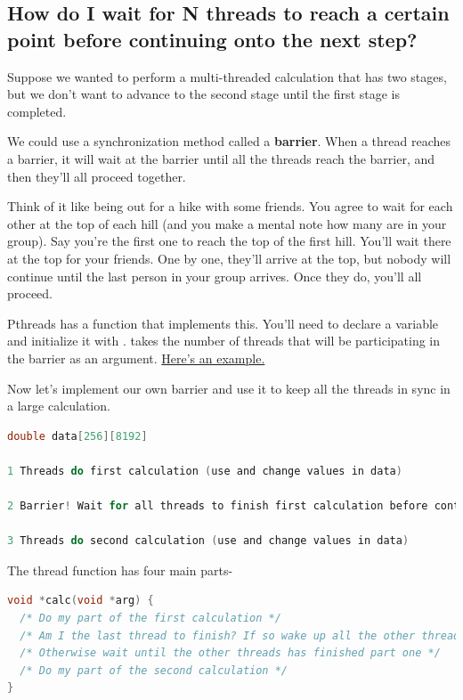 \subsection{How do I wait for N threads to reach a certain point before continuing onto the next step?}\label{how-do-i-wait-for-n-threads-to-reach-a-certain-point-before-continuing-onto-the-next-step}

Suppose we wanted to perform a multi-threaded calculation that has two stages, but we don't want to advance to the second stage until the first stage is completed.

We could use a synchronization method called a \textbf{barrier}. When a thread reaches a barrier, it will wait at the barrier until all the threads reach the barrier, and then they'll all proceed together.

Think of it like being out for a hike with some friends. You agree to wait for each other at the top of each hill (and you make a mental note how many are in your group). Say you're the first one to reach the top of the first hill. You'll wait there at the top for your friends. One by one, they'll arrive at the top, but nobody will continue until the last person in your group arrives. Once they do, you'll all proceed.

Pthreads has a function  that implements this. You'll need to declare a  variable and initialize it with .  takes the number of threads that will be participating in the barrier as an argument. \href{https://github.com/angrave/SystemProgramming/wiki/Sample-program-using-pthread-barriers}{Here's an example.}

Now let's implement our own barrier and use it to keep all the threads in sync in a large calculation.

\begin{lstlisting}[language=C]
double data[256][8192]

1 Threads do first calculation (use and change values in data)

2 Barrier! Wait for all threads to finish first calculation before continuing

3 Threads do second calculation (use and change values in data)
\end{lstlisting}

The thread function has four main parts-

\begin{lstlisting}[language=C]
void *calc(void *arg) {
  /* Do my part of the first calculation */
  /* Am I the last thread to finish? If so wake up all the other threads! */
  /* Otherwise wait until the other threads has finished part one */
  /* Do my part of the second calculation */
}
\end{lstlisting}

